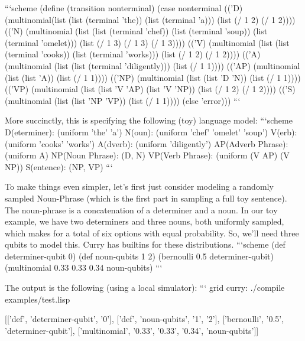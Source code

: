 \documentclass[journal]{IEEEtran}
\begin{document}
 ```scheme
 (define (transition nonterminal)
   (case nonterminal
         (('D) (multinomial(list (list (terminal 'the))
                                 (list (terminal 'a)))
                           (list (/ 1 2) (/ 1 2))))
         (('N) (multinomial (list (list (terminal 'chef))
                                  (list (terminal 'soup))
                                  (list (terminal 'omelet)))
                            (list (/ 1 3) (/ 1 3) (/ 1 3))))
         (('V) (multinomial (list (list (terminal 'cooks))
                                  (list (terminal 'works)))
                            (list (/ 1 2) (/ 1 2))))
         (('A) (multinomial (list (list (terminal 'diligently)))
                            (list (/ 1 1))))
         (('AP) (multinomial (list (list 'A))
                             (list (/ 1 1))))
         (('NP) (multinomial (list (list 'D 'N))
                             (list (/ 1 1))))
         (('VP) (multinomial (list (list 'V 'AP)
                                   (list 'V 'NP))
                             (list (/ 1 2) (/ 1 2))))
         (('S) (multinomial (list (list 'NP 'VP))
                            (list (/ 1 1))))
         (else 'error)))
 ```
 
 More succinctly, this is specifying the following (toy) language model:
 ```scheme
 D(eterminer):      (uniform 'the' 'a')
 N(oun):            (uniform 'chef' 'omelet' 'soup')
 V(erb):            (uniform 'cooks' 'works')
 A(dverb):          (uniform 'diligently')
 AP(Adverb Phrase): (uniform A)
 NP(Noun Phrase):   (D, N)
 VP(Verb Phrase):   (uniform (V AP) (V NP))
 S(entence):        (NP, VP)
 ```
 
 To make things even simpler, let's first just consider modeling a randomly sampled Noun-Phrase (which is the first part in sampling a full toy sentence).
 The noun-phrase is a concatenation of a determiner and a noun. In our toy example, we have two determiners and three nouns, both uniformly sampled, which makes for a total of six options with equal probability.
 So, we'll need three qubits to model this. Curry has builtins for these distributions.
 ```scheme
 (def determiner-qubit 0)
 (def noun-qubits 1 2)
 (bernoulli 0.5 determiner-qubit)
 (multinomial 0.33 0.33 0.34 noun-qubits)
 ```
 
 The output is the following (using a local simulator):
 ```
 grid {curry}: ./compile examples/test.lisp
 
 [['def', 'determiner-qubit', '0'],
  ['def', 'noun-qubits', '1', '2'],
  ['bernoulli', '0.5', 'determiner-qubit'],
  ['multinomial', '0.33', '0.33', '0.34', 'noun-qubits']]
 
\end{document}
